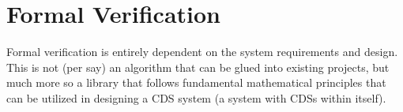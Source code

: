\section{Formal Verification}

Formal verification is entirely dependent on the system requirements and design. This is not (per say) an algorithm that can be glued into existing projects, but much more so a library that follows fundamental mathematical principles that can be utilized in designing a CDS system (a system with CDSs within itself).